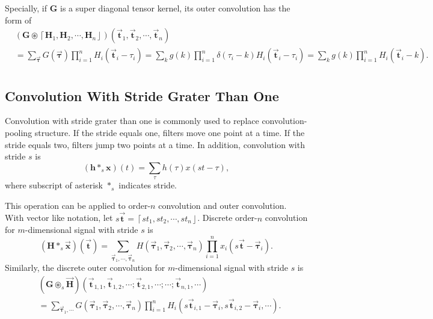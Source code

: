 \documentclass[twoside,11pt]{article}
\def\oconv{\circledast}
\def\tvar#1{\mathbf{#1}} %
\def\vsymb#1{\vec{\mathbf{#1}}}
\def\lcerfl#1{\left\lceil{#1}\right\rfloor}
\begin{document}
Specially, if \(\tvar{G}\) is a super diagonal tensor kernel, its outer convolution has the form of
\begin{equation}
  \label{equ:oconv-diag-g-h1-h2-hn}
  \begin{aligned}
     & \left(\tvar{G} \oconv \lcerfl{\tvar{H}_1, \tvar{H}_2, \cdots, \tvar{H}_n}\right)(
    \vsymb{t}_1, \vsymb{t}_2, \cdots, \vsymb{t}_n
    )                                                                                    \\
     & = \sum_{\vsymb{\tau}} G(\vsymb{\tau}) \prod_{i=1}^{n} H_i(\vsymb{t}_i - \tau_i)
    = \sum_{k} g(k) \prod_{i=1}^{n} \delta(\tau_i - k) H_i(\vsymb{t}_i - \tau_i)
    = \sum_{k} g(k) \prod_{i=1}^{n} H_i(\vsymb{t}_i - k).                                \\
  \end{aligned}
\end{equation}



\subsection{Convolution With Stride Grater Than One}
\label{subsec:convolution-with-stride-grater-than-one}

Convolution with stride grater than one is commonly used to replace convolution-pooling structure.
If the stride equals one, filters move one point at a time.
If the stride equals two, filters jump two points at a time.
In addition, convolution with stride \(s\) is
\begin{equation*}
  \left(\tvar{h} *_s \tvar{x}\right)(t) = \sum_{\tau} h(\tau) x(s t - \tau),
\end{equation*}
where subscript of asterisk \(*_s\) indicates stride.

This operation can be applied to order-\(n\) convolution and outer convolution.
With vector like notation, let \(s \vsymb{t} = \lcerfl{s t_1, s t_2, \cdots, s t_n}\). Discrete order-\(n\) convolution for \(m\)-dimensional signal with stride \(s\) is
\begin{equation}
  \left(\tvar{H} *_s \vsymb{x}\right)(\vsymb{t})
  = \sum_{\vsymb{\tau}_1, \cdots, \vsymb{\tau}_n} H(\vsymb{\tau}_1, \vsymb{\tau}_2, \cdots, \vsymb{\tau}_n) \prod_{i=1}^{n} x_i(s \vsymb{t} - \vsymb{\tau}_i).
\end{equation}
Similarly, the discrete outer convolution for \(m\)-dimensional signal with stride \(s\) is
\begin{equation}
  \begin{aligned}
     & \left( \tvar{G} \oconv_s \vsymb{H} \right)(\vsymb{t}_{1,1}, \vsymb{t}_{1,2}, \cdots; \vsymb{t}_{2,1}, \cdots; \cdots; \vsymb{t}_{n,1}, \cdots) \\
     & = \sum_{\vsymb{\tau}_1, \cdots}
    G(\vsymb{\tau}_1, \vsymb{\tau}_2, \cdots, \vsymb{\tau}_n)
    \prod_{i=1}^{n} H_i(s \vsymb{t}_{i,1} - \vsymb{\tau}_i, s \vsymb{t}_{i,2} - \vsymb{\tau}_i, \cdots).
  \end{aligned}
\end{equation}
\end{document}
